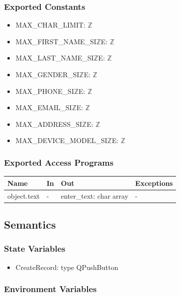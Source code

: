 \documentclass[12pt, titlepage]{article}
\begin{document}
\subsubsection{Exported Constants}

\begin{itemize}
\item MAX\_CHAR\_LIMIT: $\mathbb{Z}$
\item MAX\_FIRST\_NAME\_SI$\mathbb{Z}$E: $\mathbb{Z}$
\item MAX\_LAST\_NAME\_SI$\mathbb{Z}$E: $\mathbb{Z}$
\item MAX\_GENDER\_SI$\mathbb{Z}$E: $\mathbb{Z}$
\item MAX\_PHONE\_SI$\mathbb{Z}$E: $\mathbb{Z}$
\item MAX\_EMAIL\_SI$\mathbb{Z}$E: $\mathbb{Z}$
\item MAX\_ADDRESS\_SI$\mathbb{Z}$E: $\mathbb{Z}$
\item MAX\_DEVICE\_MODEL\_SI$\mathbb{Z}$E: $\mathbb{Z}$
\end{itemize}

\subsubsection{Exported Access Programs}

\begin{center}
\begin{tabular}{p{3cm} p{3cm} p{2cm} p{4cm}}
\hline
\textbf{Name} & \textbf{In} & \textbf{Out} & \textbf{Exceptions} \\
\hline
object.text & - & enter\_text: char array& - \\
\hline
\end{tabular}
\end{center}

\subsection{Semantics}

\subsubsection{State Variables}

\begin{itemize}
\item CreateRecord: type QPushButton
\end{itemize}

\subsubsection{Environment Variables}
\end{document}

